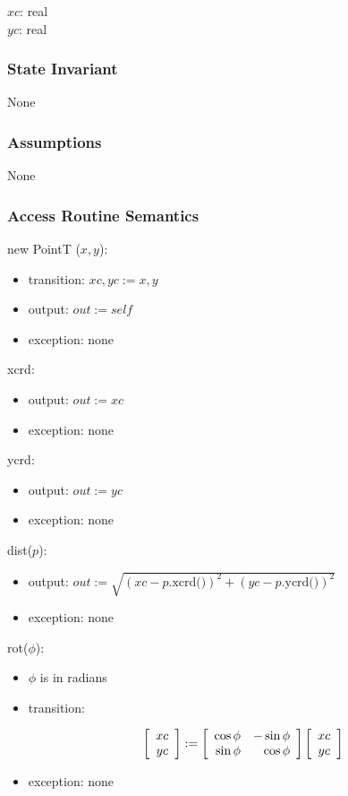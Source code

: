\documentclass[12pt,fleqn]{article}
\begin{document}
$xc$: real\\
$yc$: real

\subsubsection* {State Invariant}
None

\subsubsection* {Assumptions}
None

\subsubsection* {Access Routine Semantics}

new PointT ($x, y$):
\begin{itemize}
\item transition: $xc, yc := x, y$
\item output: $out := \mathit{self}$
\item exception: none
\end{itemize}

\noindent xcrd:
\begin{itemize}
\item output: $out := xc$
\item exception: none
\end{itemize}

\noindent ycrd:
\begin{itemize}
\item output: $out := yc$
\item exception: none
\end{itemize}

\noindent dist($p$):
\begin{itemize}
\item output:
  $out := \sqrt{(xc - p.\mbox{xcrd()})^2 + (yc - p.\mbox{ycrd()})^2}$
\item exception: none
\end{itemize}

\noindent rot($\phi$):
\begin{itemize}
\item $\phi$ is in radians
\item transition: 

$$\left [
\begin{array}{c}
xc\\
yc\\
\end{array}
\right ] :=
\left [
\begin{array}{r r}
\cos \phi & - \sin \phi\\
\sin \phi & \cos \phi\\
\end{array}
\right ]
\left [
\begin{array}{c}
xc\\
yc\\
\end{array}
\right ]
$$

\item exception: none
\end{itemize}
\end{document}
